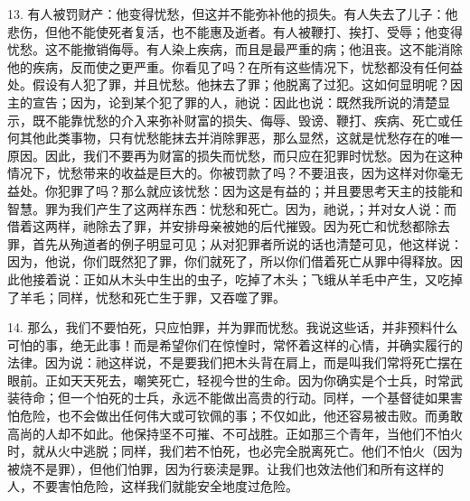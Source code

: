 13. 有人被罚财产：他变得忧愁，但这并不能弥补他的损失。有人失去了儿子：他悲伤，但他不能使死者复活，也不能惠及逝者。有人被鞭打、挨打、受辱；他变得忧愁。这不能撤销侮辱。有人染上疾病，而且是最严重的病；他沮丧。这不能消除他的疾病，反而使之更严重。你看见了吗？在所有这些情况下，忧愁都没有任何益处。假设有人犯了罪，并且忧愁。他抹去了罪；他脱离了过犯。这如何显明呢？因主的宣告；因为，论到某个犯了罪的人，祂说：因此也说：既然我所说的清楚显示，既不能靠忧愁的介入来弥补财富的损失、侮辱、毁谤、鞭打、疾病、死亡或任何其他此类事物，只有忧愁能抹去并消除罪恶，那么显然，这就是忧愁存在的唯一原因。因此，我们不要再为财富的损失而忧愁，而只应在犯罪时忧愁。因为在这种情况下，忧愁带来的收益是巨大的。你被罚款了吗？不要沮丧，因为这样对你毫无益处。你犯罪了吗？那么就应该忧愁：因为这是有益的；并且要思考天主的技能和智慧。罪为我们产生了这两样东西：忧愁和死亡。因为，祂说，；并对女人说：而借着这两样，祂除去了罪，并安排母亲被她的后代摧毁。因为死亡和忧愁都除去罪，首先从殉道者的例子明显可见；从对犯罪者所说的话也清楚可见，他这样说：因为，他说，你们既然犯了罪，你们就死了，所以你们借着死亡从罪中得释放。因此他接着说：正如从木头中生出的虫子，吃掉了木头；飞蛾从羊毛中产生，又吃掉了羊毛；同样，忧愁和死亡生于罪，又吞噬了罪。\par

14. 那么，我们不要怕死，只应怕罪，并为罪而忧愁。我说这些话，并非预料什么可怕的事，绝无此事！而是希望你们在惊惶时，常怀着这样的心情，并确实履行的法律。因为说：祂这样说，不是要我们把木头背在肩上，而是叫我们常将死亡摆在眼前。正如天天死去，嘲笑死亡，轻视今世的生命。因为你确实是个士兵，时常武装待命；但一个怕死的士兵，永远不能做出高贵的行动。同样，一个基督徒如果害怕危险，也不会做出任何伟大或可钦佩的事；不仅如此，他还容易被击败。而勇敢高尚的人却不如此。他保持坚不可摧、不可战胜。正如那三个青年，当他们不怕火时，就从火中逃脱；同样，我们若不怕死，也必完全脱离死亡。他们不怕火（因为被烧不是罪），但他们怕罪，因为行亵渎是罪。让我们也效法他们和所有这样的人，不要害怕危险，这样我们就能安全地度过危险。\par


